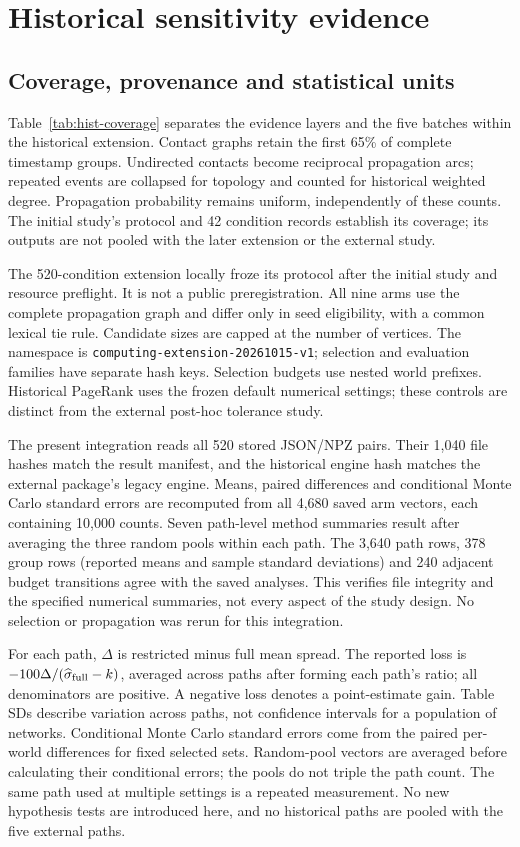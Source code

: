 \section{Historical sensitivity evidence}\label{sec:historical-evidence}
\subsection{Coverage, provenance and statistical units}
Table~\ref{tab:hist-coverage} separates the evidence layers and the five batches
within the historical extension. Contact graphs retain the first 65\% of complete
timestamp groups. Undirected contacts become reciprocal propagation arcs;
repeated events are collapsed for topology and counted for historical weighted
degree. Propagation probability remains uniform, independently of these counts.
The initial study's protocol and 42 condition records establish its coverage;
its outputs are not pooled with the later extension or the external study.


The 520-condition extension locally froze its protocol after the initial study
and resource preflight. It is not a public preregistration. All nine arms use
the complete propagation graph and differ only in seed eligibility, with a
common lexical tie rule. Candidate sizes are capped at the number of vertices.
The namespace is \texttt{computing-extension-20261015-v1}; selection and evaluation
families have separate hash keys. Selection budgets use nested world prefixes.
Historical PageRank uses the frozen default numerical settings; these controls
are distinct from the external post-hoc tolerance study.

The present integration reads all 520 stored JSON/NPZ pairs. Their 1,040 file
hashes match the result manifest, and the historical engine hash matches the
external package's legacy engine. Means, paired differences and conditional
Monte Carlo standard errors are recomputed from all 4,680 saved arm vectors,
each containing 10,000 counts. Seven path-level method summaries result after
averaging the three random pools within each path. The 3,640 path rows,
378 group rows (reported means and sample standard deviations) and 240 adjacent
budget transitions agree with the saved analyses. This verifies file integrity
and the specified numerical summaries, not every aspect of the study design.
No selection or propagation was rerun for this integration.

For each path, $\Delta$ is restricted minus full mean spread. The reported loss
is $-100\Delta/(\widehat\sigma_{\rm full}-k)$, averaged across paths after forming
each path's ratio; all denominators are positive. A negative loss denotes a
point-estimate gain. Table SDs describe variation across paths, not confidence
intervals for a population of networks. Conditional Monte Carlo standard errors
come from the paired per-world differences for fixed selected sets. Random-pool
vectors are averaged before calculating their conditional errors; the pools do
not triple the path count. The same path used at multiple settings is a repeated
measurement. No new hypothesis tests are introduced here, and no historical
paths are pooled with the five external paths.

